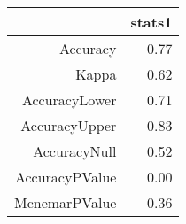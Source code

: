 \begin{table}[ht]
\centering
\begin{tabular}{rr}
  \hline
 & stats1 \\ 
  \hline
Accuracy & 0.77 \\ 
  Kappa & 0.62 \\ 
  AccuracyLower & 0.71 \\ 
  AccuracyUpper & 0.83 \\ 
  AccuracyNull & 0.52 \\ 
  AccuracyPValue & 0.00 \\ 
  McnemarPValue & 0.36 \\ 
   \hline
\end{tabular}
\end{table}
